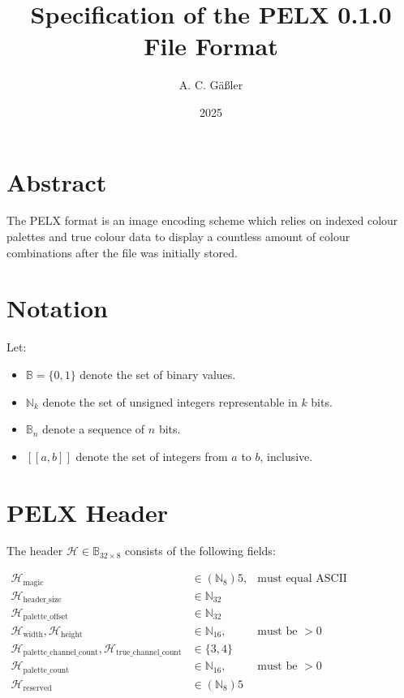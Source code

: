 \documentclass{article}
\title{Specification of the PELX 0.1.0 File Format}
\author{A. C. Gäßler}
\date{2025}
\begin{document}
\maketitle

\section*{Abstract}

The PELX format is an image encoding scheme which relies on indexed colour palettes and true colour data to display a countless amount of colour combinations after the file was initially stored.

\section{Notation}

Let:
\begin{itemize}
	\item $\mathbb{B} = \{0, 1\}$ denote the set of binary values.
	\item $\mathbb{N}_k$ denote the set of unsigned integers representable in $k$ bits.
	\item $\mathbb{B}_n$ denote a sequence of $n$ bits.
	\item $[\![a, b]\!]$ denote the set of integers from $a$ to $b$, inclusive.
\end{itemize}

\section{PELX Header}

The header $\mathcal{H} \in \mathbb{B}_{32 \times 8}$ consists of the following fields:

\begin{align*}
	\mathcal{H}_{\text{magic}} &\in (\mathbb{N}_8)5, &\text{must equal ASCII (``PELX\textbackslash0'')} \\
	\mathcal{H}_{\text{header\_size}} &\in \mathbb{N}_{32} \\
	\mathcal{H}_{\text{palette\_offset}} &\in \mathbb{N}_{32} \\
	\mathcal{H}_{\text{width}}, \mathcal{H}_{\text{height}} &\in \mathbb{N}_{16}, &\text{must be } > 0 \\
	\mathcal{H}_{\text{palette\_channel\_count}}, \mathcal{H}_{\text{true\_channel\_count}} &\in \{3, 4\} \\
	\mathcal{H}_{\text{palette\_count}} &\in \mathbb{N}_{16}, &\text{must be } > 0 \\
	\mathcal{H}_{\text{reserved}} &\in (\mathbb{N}_8)5
\end{align*}
\end{document}
